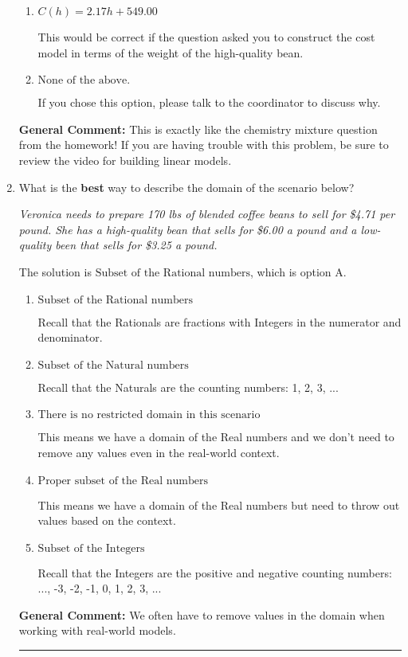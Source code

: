 \documentclass{extbook}[14pt]
\newcommand{\litem}[1]{\item #1

\rule{\textwidth}{0.4pt}}
\begin{document}
\begin{enumerate}
{\begin{enumerate}[label=\Alph*.]
* This is the correct option since the questions asked you to construct the cost model in terms of the weight of the low-quality bean.
\item \( C(h) = 2.17 h + 549.00 \)

This would be correct if the question asked you to construct the cost model in terms of the weight of the high-quality bean.
\item \( \text{None of the above.} \)

If you chose this option, please talk to the coordinator to discuss why.
\end{enumerate}

\textbf{General Comment:} This is exactly like the chemistry mixture question from the homework! If you are having trouble with this problem, be sure to review the video for building linear models.
}
\litem{
What is the \textbf{best} way to describe the domain of the scenario below?

\begin{center}
    \textit{ Veronica needs to prepare 170 lbs of blended coffee beans to sell for \$4.71 per pound. She has a high-quality bean that sells for \$6.00 a pound and a low-quality been that sells for \$3.25 a pound. }
\end{center}


The solution is \( \text{Subset of the Rational numbers} \), which is option A.\begin{enumerate}[label=\Alph*.]
\item \( \text{Subset of the Rational numbers} \)

Recall that the Rationals are fractions with Integers in the numerator and denominator.
\item \( \text{Subset of the Natural numbers} \)

Recall that the Naturals are the counting numbers: 1, 2, 3, ...
\item \( \text{There is no restricted domain in this scenario} \)

This means we have a domain of the Real numbers and we don't need to remove any values even in the real-world context.
\item \( \text{Proper subset of the Real numbers} \)

This means we have a domain of the Real numbers but need to throw out values based on the context.
\item \( \text{Subset of the Integers} \)

Recall that the Integers are the positive and negative counting numbers: ..., -3, -2, -1, 0, 1, 2, 3, ... 
\end{enumerate}

\textbf{General Comment:} We often have to remove values in the domain when working with real-world models.
}
\end{enumerate}
\end{document}
